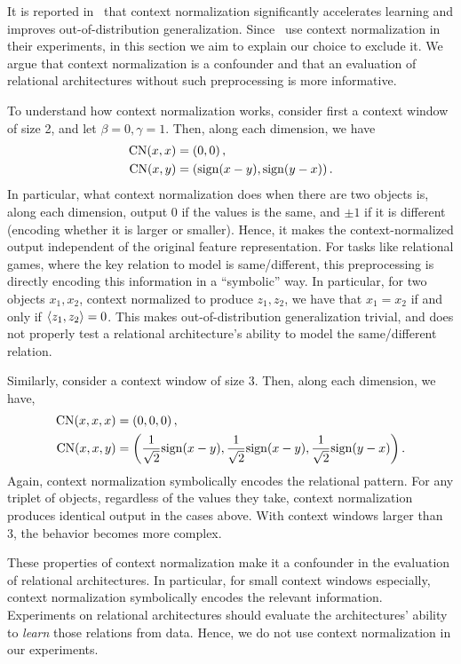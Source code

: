 It is reported in~\citep{webbEmergentSymbols2021,kergNeuralArchitecture2022} that context normalization significantly accelerates learning and improves out-of-distribution generalization. Since~\citep{webbEmergentSymbols2021,kergNeuralArchitecture2022} use context normalization in their experiments, in this section we aim to explain our choice to exclude it. We argue that context normalization is a confounder and that an evaluation of relational architectures without such preprocessing is more informative.

To understand how context normalization works, consider first a context window of size 2, and let $\beta = 0, \gamma = 1$. Then, along each dimension, we have
\begin{align*}
        \mathrm{CN}(x, x) &= \left(0, 0\right),\\
        \mathrm{CN}(x, y) &= \left(\mathrm{sign}(x - y), \mathrm{sign}(y - x)\right).
\end{align*}
In particular, what context normalization does when there are two objects is, along each dimension, output 0 if the values is the same, and $\pm 1$ if it is different (encoding whether it is larger or smaller). Hence, it makes the context-normalized output independent of the original feature representation. For tasks like relational games, where the key relation to model is same/different, this preprocessing is directly encoding this information in a ``symbolic'' way. In particular, for two objects $x_1, x_2$, context normalized to produce $z_1, z_2$, we have that $x_1 = x_2$ if and only if $\left \langle z_1, z_2 \right\rangle = 0$. This makes out-of-distribution generalization trivial, and does not properly test a relational architecture's ability to model the same/different relation.

Similarly, consider a context window of size 3. Then, along each dimension, we have,
\begin{align*}
        \mathrm{CN}(x, x, x) &= \left(0, 0, 0\right),\\
        \mathrm{CN}(x, x, y) &= \left(\frac{1}{\sqrt{2}} \mathrm{sign}(x - y), \frac{1}{\sqrt{2}} \mathrm{sign}(x - y), \frac{1}{\sqrt{2}} \mathrm{sign}(y - x)\right).
\end{align*}
Again, context normalization symbolically encodes the relational pattern. For any triplet of objects, regardless of the values they take, context normalization produces identical output in the cases above. With context windows larger than 3, the behavior becomes more complex.

These properties of context normalization make it a confounder in the evaluation of relational architectures. In particular, for small context windows especially, context normalization symbolically encodes the relevant information. Experiments on relational architectures should evaluate the architectures' ability to \textit{learn} those relations from data. Hence, we do not use context normalization in our experiments.